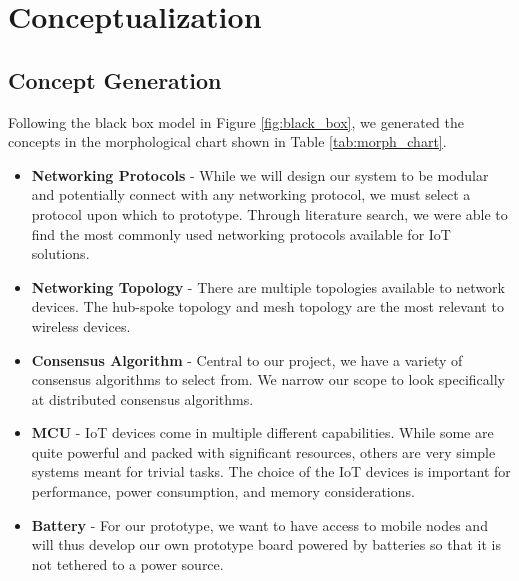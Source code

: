 \documentclass[compsoc]{IEEEtran}
\begin{document}
\newpage
\section{Conceptualization}
\subsection{Concept Generation}

Following the black box model in Figure \ref{fig:black_box}, we generated the concepts in the morphological chart shown in Table \ref{tab:morph_chart}.

\begin{itemize}
	\item \textbf{Networking Protocols} - While we will design our system to be modular and potentially connect with any networking protocol, we must select a protocol upon which to prototype. Through literature search, we were able to find the most commonly used networking protocols available for IoT solutions.
	\item \textbf{Networking Topology} - There are multiple topologies available to network devices. The hub-spoke topology and mesh topology are the most relevant to wireless devices.
	\item \textbf{Consensus Algorithm} - Central to our project, we have a variety of consensus algorithms to select from. We narrow our scope to look specifically at distributed consensus algorithms. 
	\item \textbf{MCU} - IoT devices come in multiple different capabilities. While some are quite powerful and packed with significant resources, others are very simple systems meant for trivial tasks. The choice of the IoT devices is important for performance, power consumption, and memory considerations.
	\item \textbf{Battery} - For our prototype, we want to have access to mobile nodes and will thus develop our own prototype board powered by batteries so that it is not tethered to a power source.
\end{itemize}
\end{document}
